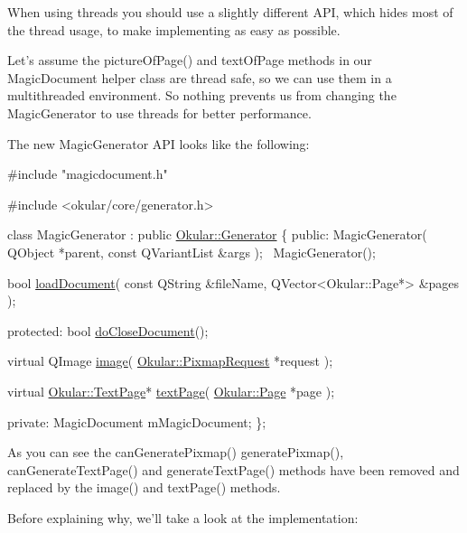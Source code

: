 When using threads you should use a slightly different A\+P\+I, which hides most of the thread usage, to make implementing as easy as possible.

Let's assume the picture\+Of\+Page() and text\+Of\+Page methods in our Magic\+Document helper class are thread safe, so we can use them in a multithreaded environment. So nothing prevents us from changing the Magic\+Generator to use threads for better performance.

The new Magic\+Generator A\+P\+I looks like the following\+:


\begin{DoxyCode}
\textcolor{preprocessor}{#include "magicdocument.h"}

\textcolor{preprocessor}{#include <okular/core/generator.h>}

\textcolor{keyword}{class }MagicGenerator : \textcolor{keyword}{public} \hyperlink{classOkular_1_1Generator}{Okular::Generator}
\{
    \textcolor{keyword}{public}:
        MagicGenerator( QObject *parent, \textcolor{keyword}{const} QVariantList &args );
        ~MagicGenerator();

        \textcolor{keywordtype}{bool} \hyperlink{classOkular_1_1Generator_a388b47328a5297d53cdbdc6fcf074ee3}{loadDocument}( \textcolor{keyword}{const} QString &fileName, QVector<Okular::Page*> &pages );

    \textcolor{keyword}{protected}:
        \textcolor{keywordtype}{bool} \hyperlink{classOkular_1_1Generator_ad3f1dcb98f3bd87c87ad0e91ecf4a6d7}{doCloseDocument}();

        \textcolor{keyword}{virtual} QImage \hyperlink{classOkular_1_1Generator_a6712c8d3c2759c3a1fcacbd503d3286e}{image}( \hyperlink{classOkular_1_1PixmapRequest}{Okular::PixmapRequest} *request );

        \textcolor{keyword}{virtual} \hyperlink{classOkular_1_1TextPage}{Okular::TextPage}* \hyperlink{classOkular_1_1Generator_af7915b97ab4b9347fb76babdda212cef}{textPage}( \hyperlink{classOkular_1_1Page}{Okular::Page} *page );

    \textcolor{keyword}{private}:
        MagicDocument mMagicDocument;
\};
\end{DoxyCode}


As you can see the can\+Generate\+Pixmap() generate\+Pixmap(), can\+Generate\+Text\+Page() and generate\+Text\+Page() methods have been removed and replaced by the image() and text\+Page() methods.

Before explaining why, we'll take a look at the implementation\+:


